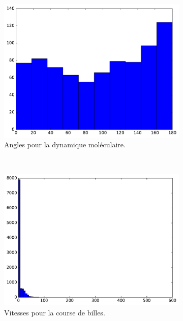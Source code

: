 \begin{figure}[htb]
\begin{subfigure}[t]{\subImgWaStats}
			\centering
			\includegraphics[width=\textwidth]{figures/ch3/atom_angle}
			\caption{Angles pour la dynamique moléculaire.}
			\label{fig:atom_angle}
		\end{subfigure}
		~
		\begin{subfigure}[t]{\subImgWaStats}
			\centering
			\includegraphics[width=\textwidth]{figures/ch3/bille_speed}
			\caption{Vitesses pour la course de billes.}
			\label{fig:bille_speed}
		\end{subfigure}
		~
		\begin{subfigure}[t]{\subImgWaStats}
			\centering

\end{subfigure}
\end{figure}
